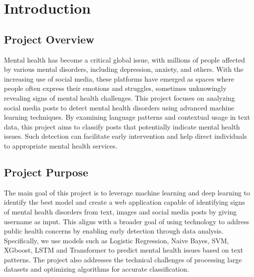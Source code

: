 
\section{Introduction}

\begin{comment}
    Briefly introduce the project's overall topic and purpose.
    \vspace{.1in}
    
    \noindent
    Provide specifications of Technical domain (Hardware, Operating System, Software) and Business domain.
    \vspace{.1in}
    
    \noindent
    Provide \textbf{Glossary} / Keywords in a tabular format.
\end{comment}


\subsection{Project Overview}
\vspace{.1in}
\noindent
Mental health has become a critical global issue, with millions of people affected by various mental disorders, including depression, anxiety, and others. With the increasing use of social media, these platforms have emerged as spaces where people often express their emotions and struggles, sometimes unknowingly revealing signs of mental health challenges. This project focuses on analyzing social media posts to detect mental health disorders using advanced machine learning techniques. By examining language patterns and contextual usage in text data, this project aims to classify posts that potentially indicate mental health issues. Such detection can facilitate early intervention and help direct individuals to appropriate mental health services.

\subsection{Project Purpose}
\vspace{.1in}
\noindent
The main goal of this project is to leverage machine learning and deep learning to identify the best model and create a web application capable of identifying signs of mental health disorders from text, images and social media posts by giving username as input. This aligns with a broader goal of using technology to address public health concerns by enabling early detection through data analysis. Specifically, we use models such as Logistic Regression, Naive Bayes, SVM, XGboost, LSTM and Transformer to predict mental health issues based on text patterns. The project also addresses the technical challenges of processing large datasets and optimizing algorithms for accurate classification.

